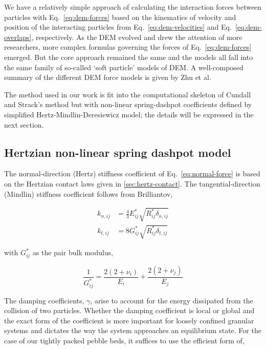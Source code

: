 We have a relatively simple approach of calculating the interaction forces between particles with Eq.~\ref{eq:dem-forces} based on the kinematics of velocity and position of the interacting particles from Eq.~\ref{eq:dem-velocities} and Eq.~\ref{eq:dem-overlaps}, respectively. As the DEM evolved and drew the attention of more researchers, more complex formulas governing the forces of Eq.~\ref{eq:dem-forces} emerged. But the core approach remained the same and the models all fall into the same family of so-called `soft particle' models of DEM. A well-composed summary of the different DEM force models is given by Zhu et al\cite{Zhu2007}.

The method used in our work is fit into the computational skeleton of Cundall and Strack's method but with non-linear spring-dashpot coefficients defined by simplified Hertz-Mindlin-Deresiewicz model; the details will be expressed in the next section.



\subsection{Hertzian non-linear spring dashpot model}

The normal-direction (Hertz) stiffness coefficient of Eq.~\ref{eq:normal-force} is based on the Hertzian contact laws given in \cref{sec:hertz-contact}. The tangential-direction (Mindlin) stiffness coefficient follows from Brilliantov\cite{Brilliantov1996, Zhu2007, Langston1995},

\begin{subequations}
\begin{align}
	k_{n,ij} &= \frac{4}{3}E_{ij}^*\sqrt{R_{ij}^*\delta_{n,ij}} \\
	k_{t,ij} &= 8 G_{ij}^*\sqrt{R_{ij}^*\delta_{t,ij}}
\end{align}
\end{subequations}

with $G_{ij}^*$ as the pair bulk modulus,

\begin{equation}
	\frac{1}{G^*_{ij}} = \frac{2(2+\nu_i)}{E_i} + \frac{2(2+\nu_j)}{E_j}
\end{equation}

The damping coefficients, $\gamma$, arise to account for the energy dissipated from the collision of two particles\cite{DiRenzo2004, Tsuji1992, Tsuji1993}. Whether the damping coefficient is local or global and the exact form of the coefficient is more important for loosely confined granular systems and dictates the way the system approaches an equilibrium state\cite{Makse2004}. For the case of our tightly packed pebble beds, it suffices to use the efficient form of\cite{Dippel1996, Makse2004, Brilliantov1996, Zhang2005, Zhu2007},

